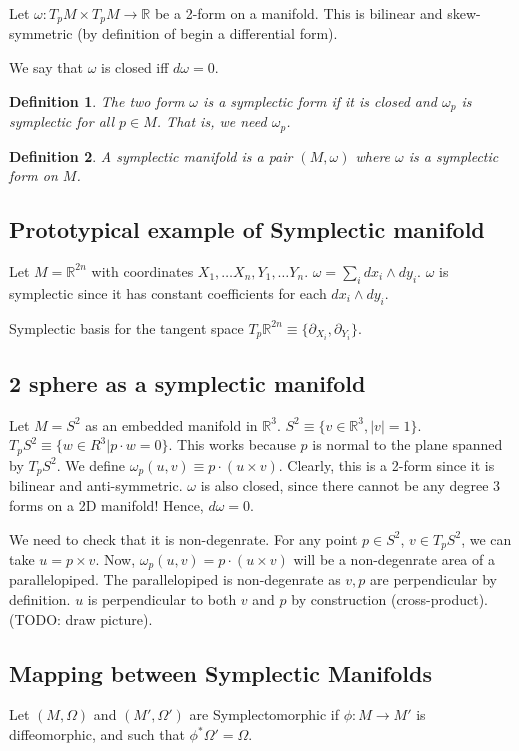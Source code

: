 \documentclass[11pt]{book}
\newcommand{\R}{\ensuremath{\mathbb R}}
\newtheorem{definition}{Definition}
\begin{document}
Let $\omega: T_p M \times T_p M \rightarrow \mathbb R$ be a 2-form on a manifold.
This is bilinear and skew-symmetric (by definition of begin a differential form).

We say that $\omega$ is closed iff $d\omega = 0$.

\begin{definition}
    The two form $\omega$ is a symplectic form if it is closed and $\omega_p$
    is symplectic for all $p \in M$. That is, we need $\omega_p$.
\end{definition}

\begin{definition}
    A symplectic manifold is a pair $(M, \omega)$ where $\omega$ is a symplectic
    form on $M$.
\end{definition}

\subsection{Prototypical example of Symplectic manifold}
Let $M = \R^{2n}$ with coordinates $X_1, \dots X_n, Y_1, \dots Y_n$.
$\omega = \sum_i dx_i  \wedge dy_i$.  $\omega$ is symplectic since it
has constant coefficients for each $dx_i \wedge dy_i$.

Symplectic basis for the tangent space 
$T_p \R^{2n} \equiv \{ \partial_{X_i}, \partial_{Y_i} \}$.

\subsection{2 sphere as a symplectic manifold}
Let $M = S^2$ as an embedded manifold in $\R^3$.
$S^2 \equiv \{ v \in \R^3, |v| = 1 \}$.
$T_p S^2 \equiv \{ w \in R^3 | p \cdot w = 0 \}$.
This works because $p$ is normal to the plane spanned by $T_p S^2$.
We define $\omega_p(u, v) \equiv p \cdot (u \times v)$. Clearly, this is
a 2-form since it is bilinear and anti-symmetric. $\omega$ is also closed,
since there cannot be any degree 3 forms on a 2D manifold! Hence, $d\omega = 0$.

We need to check that it is non-degenrate. For any point $p \in S^2$, 
$v \in T_p S^2$, we can take $u = p \times v$. Now, $\omega_p(u, v) = p \cdot(u \times v)$ will be
a non-degenrate area of a parallelopiped. The parallelopiped is non-degenrate 
as $v, p$ are perpendicular by definition. $u$ is perpendicular to both $v$
and $p$ by construction (cross-product). (TODO: draw picture).

\subsection{Mapping between Symplectic Manifolds}
Let $(M, \Omega)$ and $(M', \Omega')$ are Symplectomorphic if $\phi: M \rightarrow M'$
is diffeomorphic, and such that $\phi^* \Omega' = \Omega$.
\end{document}
